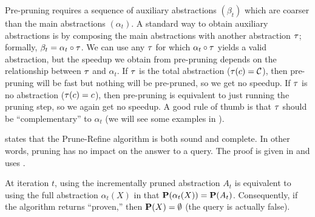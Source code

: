 Pre-pruning requires a sequence of auxiliary abstractions $(\beta_t)$ which are coarser than the main abstractions $(\alpha_t)$.
A standard way to obtain auxiliary abstractions is by composing the main abstractions
with another abstraction $\tau$; formally, $\beta_t = \alpha_t \circ \tau$.
We can use any $\tau$ for which $\alpha_t \circ \tau$ yields a valid abstraction,
but the speedup we obtain from pre-pruning depends on the relationship between $\tau$ and $\alpha_t$.
If $\tau$ is the total abstraction ($\tau(c) = \mathcal{C}$), then pre-pruning will be fast but nothing will be pre-pruned,
so we get no speedup.
If $\tau$ is no abstraction ($\tau(c) = c$), then pre-pruning is equivalent to just running the pruning step,
so we again get no speedup.
A good rule of thumb is that $\tau$ should be ``complementary'' to $\alpha_t$
(we will see some examples in ).

 states that the Prune-Refine algorithm is both
sound and complete.  In other words, pruning has no impact on the answer to a
query.
The proof is given in  and uses .

\begin{theorem}
\label{thm:algorithm}
At iteration $t$,
using the incrementally pruned abstraction $A_t$ is equivalent
to using the full abstraction $\alpha_t(X)$ in that $\mathbf{P}(\alpha_t(X)) = \mathbf{P}(A_t)$.
Consequently, if the algorithm returns ``proven,'' then $\mathbf{P}(X) = \emptyset$ (the query is actually false).
\end{theorem}
